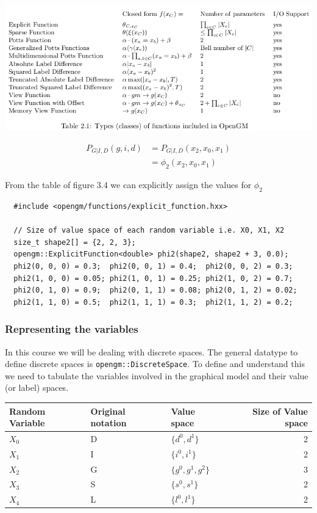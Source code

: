 \documentclass[12pt,oneside,letterpaper]{article}
\begin{document}
\includegraphics[width=\textwidth, trim=0 0 0 0, clip]{media/availablefunctions.png}

\begin{align}
  P_{G|I,D}(g, i, d) &= P_{G|I,D}(x_2, x_0, x_1) \\
                     &= \phi_2(x_2, x_0, x_1)
\end{align}

From the table of figure 3.4 we can explicitly assign the values for $\phi_2$

\begin{lstlisting}
  #include <opengm/functions/explicit_function.hxx>

  // Size of value space of each random variable i.e. X0, X1, X2
  size_t shape2[] = {2, 2, 3};
  opengm::ExplicitFunction<double> phi2(shape2, shape2 + 3, 0.0);
  phi2(0, 0, 0) = 0.3;  phi2(0, 0, 1) = 0.4;  phi2(0, 0, 2) = 0.3;
  phi2(1, 0, 0) = 0.05; phi2(1, 0, 1) = 0.25; phi2(1, 0, 2) = 0.7;
  phi2(0, 1, 0) = 0.9;  phi2(0, 1, 1) = 0.08; phi2(0, 1, 2) = 0.02;
  phi2(1, 1, 0) = 0.5;  phi2(1, 1, 1) = 0.3;  phi2(1, 1, 2) = 0.2;
\end{lstlisting}


\subsubsection{Representing the variables}

In this course we will be dealing with discrete spaces. The general datatype to
define discrete spaces is \lstinline|opengm::DiscreteSpace|. To define and
understand this we need to tabulate the variables involved in the graphical
model and their value (or label) spaces.

\begin{tabular}{|l|l|l|r|}
  \hline
  Random Variable & Original notation & Value space & Size of Value space \\
  \hline
  $X_0$ & D & $\{d^0, d^1\}$ & 2\\
  $X_1$ & I & $\{i^0, i^1\}$ & 2\\
  $X_2$ & G & $\{g^0, g^1, g^2\}$ & 3\\
  $X_3$ & S & $\{s^0, s^1\}$ & 2\\
  $X_4$ & L & $\{l^0, l^1\}$ & 2\\
  \hline
\end{tabular}
\end{document}
